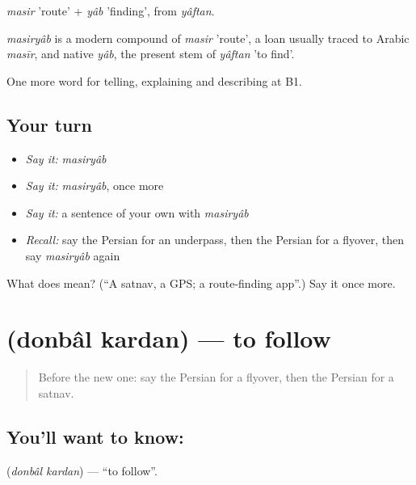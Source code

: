 \emph{masir} 'route' + \emph{yâb} 'finding', from \emph{yâftan}.

\begin{cousinweb}
\emph{masiryâb} is a modern compound of \emph{masir} 'route', a loan usually traced to Arabic \emph{masīr}, and native \emph{yâb}, the present stem of \emph{yâftan} 'to find'.
\end{cousinweb}

\begin{grammarlens}[title={What you've built}]
One more word for telling, explaining and describing at B1.
\end{grammarlens}

\subsection*{Your turn}
\begin{itemize}
\raggedright
  \item \emph{Say it:} \emph{masiryâb}
  \item \emph{Say it:} \emph{masiryâb}, once more
  \item \emph{Say it:} a sentence of your own with \emph{masiryâb}
  \item \emph{Recall:} say the Persian for an underpass, then the Persian for a flyover, then say \emph{masiryâb} again
\end{itemize}

\begin{tcolorbox}[breakable,colback=teal!4,colframe=teal!35!black,title={Before you move on}]
What does  mean? (\textquotedblleft{}A satnav, a GPS; a route-finding app\textquotedblright{}.) Say it once more.
\end{tcolorbox}
\section[\texorpdfstring{\fa{دنبال} \fa{کردن} (donbâl kardan)}{دنبال کردن (donbâl kardan)}]{  (donbâl kardan) — to follow}

\label{lesson:FA-C449-donbal-kardan}



\begin{quote}
Before the new one: say the Persian for a flyover, then the Persian for a satnav.
\end{quote}

\subsection*{You'll want to know:  }
\textbf{ } (\emph{donbâl kardan}) — \textquotedblleft{}to follow\textquotedblright{}.

